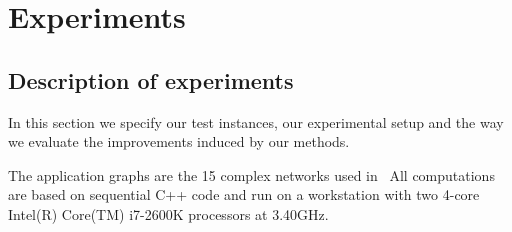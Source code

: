 \documentclass[10pt, conference, compsocconf]{IEEEtran}
\begin{document}
%
%
\section{Experiments}
\label{sec:experiments}

\subsection{Description of experiments}
\label{subsec:setup}
%
In this section we specify our test instances, our experimental setup
and the way we evaluate the improvements induced by our methods.

The application graphs are the 15 complex networks used
in~\cite{Safro2012a} %
All computations are based on sequential C++ code and run on a workstation with two
4-core Intel(R) Core(TM) i7-2600K processors at 3.40GHz.
\end{document}
